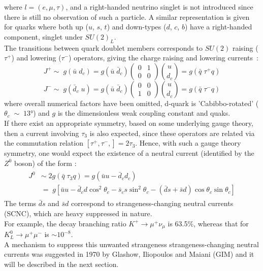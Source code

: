where $ l= (e,\mu,\tau)$, and a right-handed neutrino singlet is not introduced since there is still no observation of such a particle. A similar representation is given for
quarks where both up ($u$, $s$, $t$) and down-types ($d$, $c$, $b$) have a right-handed component, singlet under $SU(2)_L$.
\vspace{\baselineskip}
\\The transitions between quark doublet members corresponds to $SU(2)$ raising ($\tau^+$) and lowering ($\tau^-$) operators, giving the charge raising and lowering currents~\cite{renton}:
\begin{equation*}
J^{+} \sim \; g(\bar{u} \; d_{c}) = g(\bar{u} \; \bar{d}_{c})\left(\begin{array}{cc}  
																								0 & 1 \\ 
																								0 & 0
																								\end{array} \right)  \binom{u}{d_c} = g (\bar{q} \; \tau^{+}q)  
\end{equation*}
\begin{equation}
J^{-} \sim \; g(\bar{d}_c \; u) = g(\bar{u} \; \bar{d}_{c})\left(\begin{array}{cc}  
																								0 & 0 \\ 
																								1 & 0
																								\end{array} \right)  \binom{u}{d_c} = g (\bar{q} \; \tau^{-}q)  
\end{equation}
where overall numerical factors have been omitted, d-quark is 'Cabibbo-rotated' ($\theta_c\;\sim\; 13\si{\degree}$) and  $g$ is the dimensionless weak coupling constant and quaks.
\vspace{\baselineskip}
\\If there exist an appropriate symmetry, based on some underlying gauge theory, then a current involving $\tau_3$ is also expected, since these operators are related via 
the commutation relation $\left[  \tau^{+}, \tau^{-}, \right] = 2\tau_3$. Hence, with such a gauge theory symmetry, one would expect the existence of a neutral current
(identified by the $Z^0$ boson) of the form :
\begin {align}
	\begin{split}
		J^{0} & \sim \; 2g (\bar{q} \; \tau_{3}q)  = g(\bar{u} u- \bar{d}_{c} d_{c}) \\
				& = \; g[ \bar{u} u- \bar{d}_{c} d \cos^{2}\theta_{c}  - \bar{s}_{c} s \sin^{2}\theta_{c} - (\bar{d} s + \bar{s} d) \cos\theta_{c}\sin\theta_{c}  ]
	\end{split}						
\end{align}
The terms $\bar{d} s$ and $\bar{s} d$ correspond to strangeness-changing neutral currents (SCNC), which are heavy suppressed in nature. \\
For example, the decay branching ratio $K^{+}\rightarrow \mu^{+} \nu_{\mu}$ is 63.5\%, whereas that for $K^{0}_{L}\rightarrow \mu^{+} \mu^{-}$ is $\sim 10^{-8}$.\\
A mechanism to suppress this unwanted strangeness strangeness-changing neutral currents was suggested in 1970 by Glashow, Iliopoulos and Maiani (GIM) and it will be described in the next section.

